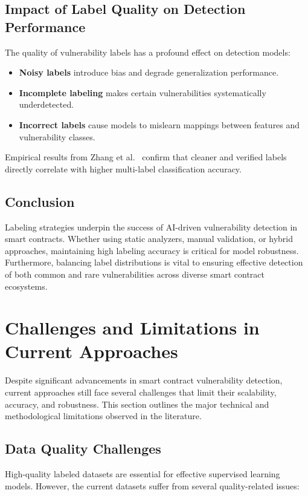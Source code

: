 \subsection{Impact of Label Quality on Detection Performance}

The quality of vulnerability labels has a profound effect on detection models:

\begin{itemize}
    \item \textbf{Noisy labels} introduce bias and degrade generalization performance.
    \item \textbf{Incomplete labeling} makes certain vulnerabilities systematically underdetected.
    \item \textbf{Incorrect labels} cause models to mislearn mappings between features and vulnerability classes.
\end{itemize}

Empirical results from Zhang et al.~\cite{zhang2020scvd} confirm that cleaner and verified labels directly correlate with higher multi-label classification accuracy.

\subsection{Conclusion}

Labeling strategies underpin the success of AI-driven vulnerability detection in smart contracts. Whether using static analyzers, manual validation, or hybrid approaches, maintaining high labeling accuracy is critical for model robustness. Furthermore, balancing label distributions is vital to ensuring effective detection of both common and rare vulnerabilities across diverse smart contract ecosystems.


\section{Challenges and Limitations in Current Approaches}
Despite significant advancements in smart contract vulnerability detection, current approaches still face several challenges that limit their scalability, accuracy, and robustness. This section outlines the major technical and methodological limitations observed in the literature.

\subsection*{Data Quality Challenges}
High-quality labeled datasets are essential for effective supervised learning models. However, the current datasets suffer from several quality-related issues:

